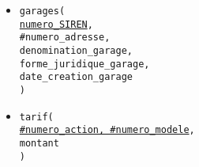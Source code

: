 \documentclass[a4paper,11pt]{article} %
\begin{document}
\begin{itemize}[leftmargin=*]
{    )}
    \item \texttt{garages( \\
        \underline{numero\_SIREN}, \\
        \#numero\_adresse, \\
        denomination\_garage, \\
        forme\_juridique\_garage, \\
        date\_creation\_garage \\
    )}
    \item \texttt{tarif( \\
        \underline{\#numero\_action, \#numero\_modele}, \\
        montant \\
    )}
\end{itemize}
\end{document}
